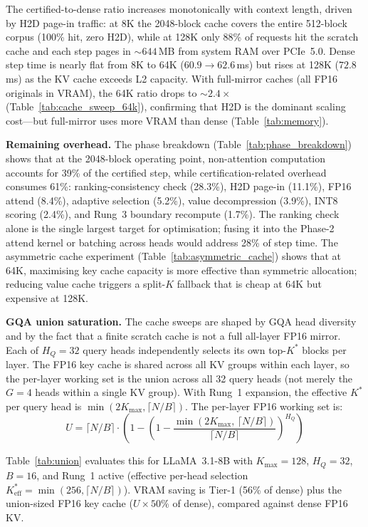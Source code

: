 \documentclass[11pt,a4paper]{article}
\theoremstyle{definition}
\theoremstyle{remark}
\begin{document}
The certified-to-dense ratio increases monotonically with context length, driven by H2D page-in traffic: at 8K the 2048-block cache covers the entire 512-block corpus (100\% hit, zero H2D), while at 128K only 88\% of requests hit the scratch cache and each step pages in ${\sim}644$\,MB from system RAM over PCIe~5.0.  Dense step time is nearly flat from 8K to 64K ($60.9 \to 62.6$\,ms) but rises at 128K ($72.8$\,ms) as the KV cache exceeds L2 capacity.  With full-mirror caches (all FP16 originals in VRAM), the 64K ratio drops to ${\sim}2.4\times$ (Table~\ref{tab:cache_sweep_64k}), confirming that H2D is the dominant scaling cost---but full-mirror uses more VRAM than dense (Table~\ref{tab:memory}).

\textbf{Remaining overhead.}  The phase breakdown (Table~\ref{tab:phase_breakdown}) shows that at the 2048-block operating point, non-attention computation accounts for 39\% of the certified step, while certification-related overhead consumes 61\%: ranking-consistency check (28.3\%), H2D page-in (11.1\%), FP16 attend (8.4\%), adaptive selection (5.2\%), value decompression (3.9\%), INT8 scoring (2.4\%), and Rung~3 boundary recompute (1.7\%).  The ranking check alone is the single largest target for optimisation; fusing it into the Phase-2 attend kernel or batching across heads would address 28\% of step time.  The asymmetric cache experiment (Table~\ref{tab:asymmetric_cache}) shows that at 64K, maximising key cache capacity is more effective than symmetric allocation; reducing value cache triggers a split-$K$ fallback that is cheap at 64K but expensive at 128K.

\textbf{GQA union saturation.}  The cache sweeps are shaped by GQA head diversity and by the fact that a finite scratch cache is not a full all-layer FP16 mirror.  Each of $H_Q{=}32$ query heads independently selects its own top-$K^*$ blocks per layer.  The FP16 key cache is shared across all KV groups within each layer, so the per-layer working set is the union across all 32 query heads (not merely the $G{=}4$ heads within a single KV group).  With Rung~1 expansion, the effective $K^*$ per query head is $\min(2K_{\max}, \lceil N/B \rceil)$.  The per-layer FP16 working set is:
\begin{equation}
\label{eq:union}
  U = \lceil N/B \rceil \cdot \left(1 - \left(1 - \frac{\min(2K_{\max},\, \lceil N/B \rceil)}{\lceil N/B \rceil}\right)^{H_Q}\right)
\end{equation}

Table~\ref{tab:union} evaluates this for LLaMA~3.1-8B
with $K_{\max}{=}128$, $H_Q{=}32$, $B{=}16$,
and Rung~1 active
(effective per-head selection $K^*_{\mathrm{eff}} = \min(256,\allowbreak \lceil N/B \rceil)$).
VRAM saving is Tier-1 (56\% of dense) plus the
union-sized FP16 key cache ($U \times 50\%$ of dense),
compared against dense FP16 KV\@.
\end{document}
